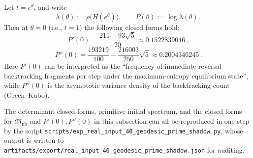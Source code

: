 \begin{theorem}\label{thm:real-input-40-backtracking-cumulants}
Let \(t=e^{\theta}\), and write
\[
\lambda(\theta):=\rho\!\bigl(H(e^{\theta})\bigr),\qquad
P(\theta):=\log\lambda(\theta).
\]
Then at \(\theta=0\) (i.e., \(t=1\)) the following closed forms hold:
\[
\boxed{\;
P'(0)=\frac{211-93\sqrt5}{20}\approx 0.1522839046\;},
\]
\[
\boxed{\;
P''(0)=\frac{193219}{100}-\frac{216003}{250}\sqrt5\approx 0.2004346245\; }.
\]
Here \(P'(0)\) can be interpreted as the ``frequency of immediate-reversal backtracking fragments per step under the maximum-entropy equilibrium state'', while \(P''(0)\) is the asymptotic variance density of the backtracking count (Green--Kubo).
\end{theorem}

\begin{remark}\label{rem:real-input-40-geodesic-repro}
The determinant closed forms, primitive initial spectrum, and the closed forms for \(\mathfrak{M}_{\mathrm{nb}}\) and \(P'(0),P''(0)\) in this subsection
can all be reproduced in one step by the script \texttt{scripts/exp\_real\_input\_40\_geodesic\_prime\_shadow.py},
whose output is written to \texttt{artifacts/export/real\_input\_40\_geodesic\_prime\_shadow.json} for auditing.
\end{remark}
